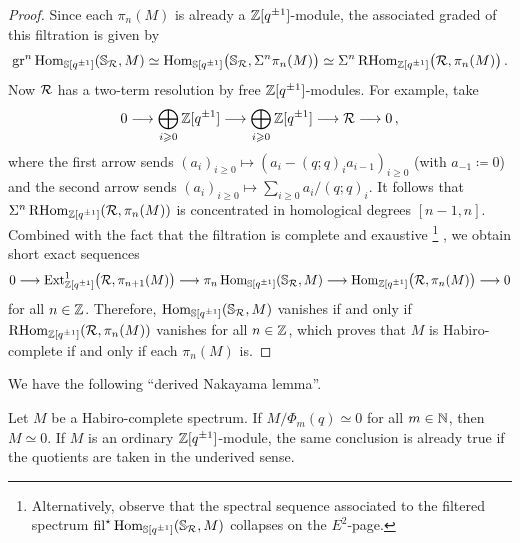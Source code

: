 \documentclass[DIV=12,numbers=enddot,leqno,bibliography=totoc]{scrartcl}
\begin{document}
\begin{proof}
		Since each $\pi_n(M)$ is already a $\mathbb{Z}[q^{\pm 1}]$-module, the associated graded of this filtration is given by
		\begin{equation*}
			\operatorname{gr}^n\operatorname{Hom}_{\mathbb{S}[q^{\pm 1}]}(\mathbb{S}_{\mathcal{R}},M)\simeq \operatorname{Hom}_{\mathbb{S}[q^{\pm 1}]}\bigl(\mathbb{S}_{\mathcal{R}},\Sigma^n\pi_n(M)\bigr)\simeq \Sigma^n\operatorname{RHom}_{\mathbb{Z}[q^{\pm 1}]}\bigl(\mathcal{R},\pi_n(M)\bigr)\,.
		\end{equation*}
		Now $\mathcal{R}$ has a two-term resolution by free $\mathbb{Z}[q^{\pm 1}]$-modules. For example, take
		\begin{equation*}
			0\longrightarrow \bigoplus_{i\geqslant 0}\mathbb{Z}[q^{\pm 1}]\longrightarrow \bigoplus_{i\geqslant 0}\mathbb{Z}[q^{\pm 1}]\longrightarrow \mathcal{R}\longrightarrow 0\,,
		\end{equation*}
		where the first arrow sends $(a_i)_{i\geqslant 0}\mapsto (a_i-(q;q)_ia_{i-1})_{i\geqslant 0}$ (with $a_{-1}\coloneqq 0$) and the second arrow sends $(a_i)_{i\geqslant 0}\mapsto\sum_{i\geqslant 0}a_i/(q;q)_i$. It follows that $\Sigma^n\operatorname{RHom}_{\mathbb{Z}[q^{\pm 1}]}(\mathcal{R},\pi_n(M))$ is concentrated in homological degrees $[n-1,n]$. Combined with the fact that the filtration is complete and exaustive%
		\footnote{Alternatively, observe that the spectral sequence associated to the filtered spectrum $ \operatorname{fil}^\star \operatorname{Hom}_{\mathbb{S}[q^{\pm 1}]}(\mathbb{S}_{\mathcal{R}},M)$ collapses on the $E^2$-page.}%
		, we obtain short exact sequences
		\begin{equation*}
			0\longrightarrow \operatorname{Ext}_{\mathbb{Z}[q^{\pm 1}]}^1\bigl(\mathcal{R},\pi_{n+1}(M)\bigr)\longrightarrow\pi_n\operatorname{Hom}_{\mathbb{S}[q^{\pm 1}]}(\mathbb{S}_{\mathcal{R}},M)\longrightarrow \operatorname{Hom}_{\mathbb{Z}[q^{\pm 1}]}\bigl(\mathcal{R},\pi_n(M)\bigr)\longrightarrow 0
		\end{equation*}
		for all $n\in\mathbb{Z}$. Therefore, $\operatorname{Hom}_{\mathbb{S}[q^{\pm 1}]}(\mathbb{S}_{\mathcal{R}},M)$ vanishes if and only if $\operatorname{RHom}_{\mathbb{Z}[q^{\pm 1}]}(\mathcal{R},\pi_n(M))$ vanishes for all $n\in\mathbb{Z}$, which proves that $M$ is Habiro-complete if and only if each $\pi_n(M)$ is.
	\end{proof}
	We have the following \enquote{derived Nakayama lemma}.
	\begin{lem}\label{lem:HabiroCompleteDerivedNakayama}
		Let $M$ be a Habiro-complete spectrum. If $M/\Phi_m(q)\simeq 0$ for all $m\in\mathbb{N}$, then $M\simeq 0$. If $M$ is an ordinary $\mathbb{Z}[q^{\pm 1}]$-module, the same conclusion is already true if the quotients are taken in the underived sense.
	\end{lem}
\end{document}
